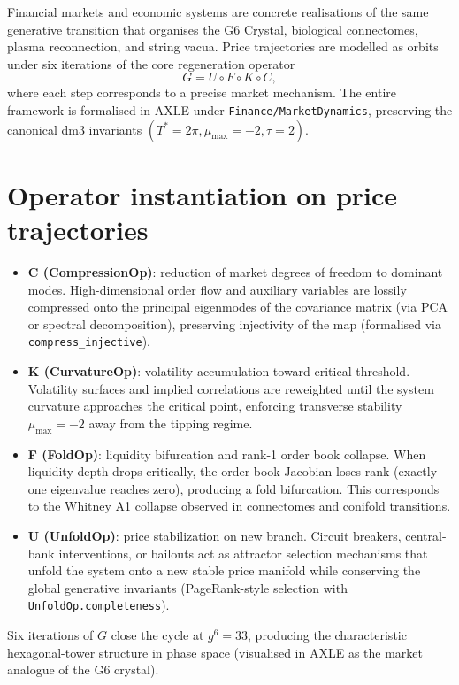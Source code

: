 \documentclass[19pt]{book}
\theoremstyle{plain}
\theoremstyle{definition}
\theoremstyle{remark}
\begin{document}
Financial markets and economic systems are concrete realisations of the same generative transition that organises the G6 Crystal, biological connectomes, plasma reconnection, and string vacua. Price trajectories are modelled as orbits under six iterations of the core regeneration operator
\[
G = U \circ F \circ K \circ C,
\]
where each step corresponds to a precise market mechanism. The entire framework is formalised in AXLE under \texttt{Finance/MarketDynamics}, preserving the canonical dm3 invariants \((T^* = 2\pi, \mu_{\max} = -2, \tau = 2)\).

\section{Operator instantiation on price trajectories}

\begin{itemize}
\item \textbf{C (CompressionOp)}: reduction of market degrees of freedom to dominant modes. High-dimensional order flow and auxiliary variables are lossily compressed onto the principal eigenmodes of the covariance matrix (via PCA or spectral decomposition), preserving injectivity of the map (formalised via \texttt{compress\_injective}).
\item \textbf{K (CurvatureOp)}: volatility accumulation toward critical threshold. Volatility surfaces and implied correlations are reweighted until the system curvature approaches the critical point, enforcing transverse stability \(\mu_{\max} = -2\) away from the tipping regime.
\item \textbf{F (FoldOp)}: liquidity bifurcation and rank-1 order book collapse. When liquidity depth drops critically, the order book Jacobian loses rank (exactly one eigenvalue reaches zero), producing a fold bifurcation. This corresponds to the Whitney A1 collapse observed in connectomes and conifold transitions.
\item \textbf{U (UnfoldOp)}: price stabilization on new branch. Circuit breakers, central-bank interventions, or bailouts act as attractor selection mechanisms that unfold the system onto a new stable price manifold while conserving the global generative invariants (PageRank-style selection with \texttt{UnfoldOp.completeness}).
\end{itemize}

Six iterations of \(G\) close the cycle at \(g^6 = 33\), producing the characteristic hexagonal-tower structure in phase space (visualised in AXLE as the market analogue of the G6 crystal).
\end{document}
